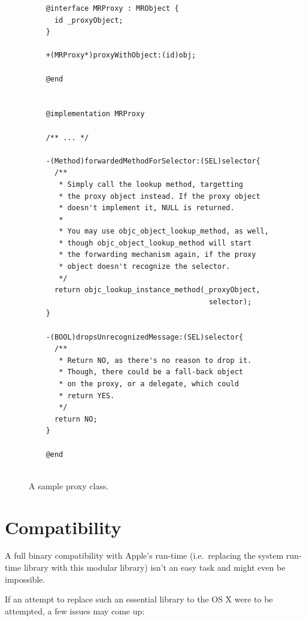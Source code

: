 \begin{figure}[htbp] 
  \begin{verbatim}
    @interface MRProxy : MRObject {
      id _proxyObject;
    }
    
    +(MRProxy*)proxyWithObject:(id)obj;
    
    @end
    
    
    @implementation MRProxy
    
    /** ... */
    
    -(Method)forwardedMethodForSelector:(SEL)selector{
      /** 
       * Simply call the lookup method, targetting
       * the proxy object instead. If the proxy object
       * doesn't implement it, NULL is returned.
       *
       * You may use objc_object_lookup_method, as well,
       * though objc_object_lookup_method will start
       * the forwarding mechanism again, if the proxy
       * object doesn't recognize the selector.
       */
      return objc_lookup_instance_method(_proxyObject, 
                                          selector);
    }
    
    -(BOOL)dropsUnrecognizedMessage:(SEL)selector{
      /** 
       * Return NO, as there's no reason to drop it.
       * Though, there could be a fall-back object 
       * on the proxy, or a delegate, which could 
       * return YES.
       */
      return NO;
    }
    
    @end
    
  \end{verbatim}
  \centering{}
  \caption{A sample proxy class.}
  \label{fig:forwarding_proxy_class}
\end{figure}

 

\section{Compatibility}

A full binary compatibility with Apple's run-time (i.e.\ replacing the system run-time library with this modular library) isn't an easy task and might even be impossible.

If an attempt to replace such an essential library to the OS X were to be attempted, a few issues may come up:

